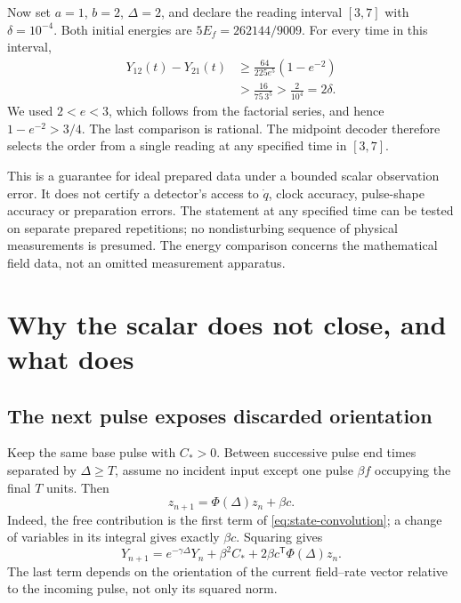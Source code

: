\documentclass[11pt,a4paper]{article}
\theoremstyle{remark}
\begin{document}
Now set $a=1$, $b=2$, $\Delta=2$, and declare the reading interval
$[3,7]$ with $\delta=10^{-4}$. Both initial energies are
$5E_f=262144/9009$. For every time in this interval,
\begin{align}
 Y_{12}(t)-Y_{21}(t)
 &\ge\frac{64}{225e^5}(1-e^{-2})\nonumber\\
 &>\frac{16}{75\,3^5}>\frac{2}{10^4}=2\delta.
 \label{eq:margin}
\end{align}
We used $2<e<3$, which follows from the factorial series, and hence
$1-e^{-2}>3/4$. The last comparison is rational. The midpoint decoder
therefore selects the order from a single reading at any specified time
in $[3,7]$.

This is a guarantee for ideal prepared data under a bounded scalar
observation error. It does not certify a detector's access to $\dot q$,
clock accuracy, pulse-shape accuracy or preparation errors. The statement
at any specified time can be tested on separate prepared repetitions;
no nondisturbing sequence of physical measurements is presumed. The
energy comparison concerns the mathematical field data, not an omitted
measurement apparatus.

\section{Why the scalar does not close, and what does}
\label{sec:closure}

\subsection{The next pulse exposes discarded orientation}

Keep the same base pulse with $C_*>0$. Between successive pulse end times
separated by $\Delta\ge T$, assume no incident input except one pulse
$\beta f$ occupying the final $T$ units. Then
\begin{equation}
 z_{n+1}=\Phi(\Delta)z_n+\beta c.
 \label{eq:affine}
\end{equation}
Indeed, the free contribution is the first term of
\eqref{eq:state-convolution}; a change of variables in its integral gives
exactly $\beta c$. Squaring gives
\begin{equation}
 Y_{n+1}=e^{-\gamma\Delta}Y_n+\beta^2C_*
             +2\beta c^{\mathsf T}\Phi(\Delta)z_n.
 \label{eq:scalar-update}
\end{equation}
The last term depends on the orientation of the current field--rate
vector relative to the incoming pulse, not only its squared norm.
\end{document}
